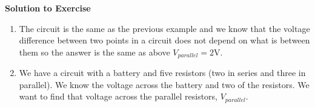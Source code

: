 {\begin{mdframed}[linewidth=4, leftmargin=40, rightmargin=40]
\begin{exercise}
 \par 
        \vspace{5pt}
        \label{m38772*solfhsst!!!underscore!!!id1287}\noindent\textbf{Solution to Exercise } \label{m38772*listfhsst!!!underscore!!!id1287}\begin{enumerate}[noitemsep, label=\textbf{Step} \textbf{\arabic*}. ] 
            \leftskip=20pt\rightskip=\leftskip\item  
        \label{m38772*id66121}The circuit is the same as the previous example and we know that the voltage difference between two points in a circuit does not depend on what is between them so the answer is the same as above \begin{math}{V}_{parallel}=2\mathrm{V}\end{math}.\par 
        \item  
        \label{m38772*id66171}We have a circuit with a battery and five resistors (two in series and three in parallel). We know the voltage across the battery and two of the resistors. We want to find that voltage across the parallel resistors, \begin{math}{V}_{parallel}\end{math}.\par 
        \label{m38772*id66206}\nopagebreak\noindent{}
    

\end{enumerate}
\end{exercise}
\end{mdframed}}
